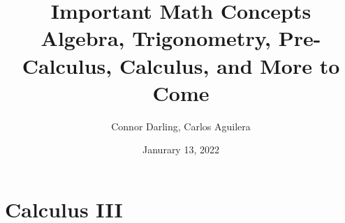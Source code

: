 \documentclass{report}
\title{\Huge Important Math Concepts\\
{\huge Algebra, Trigonometry, Pre-Calculus, Calculus, and More to Come}}
\author{\Large Connor Darling, Carlos Aguilera}
\date{Janurary 13, 2022}
\begin{document}
\maketitle
\newpage%
\tableofcontents
\pagebreak


 

 
 
 
 

\chapter{Calculus III}
%  
\end{document}
